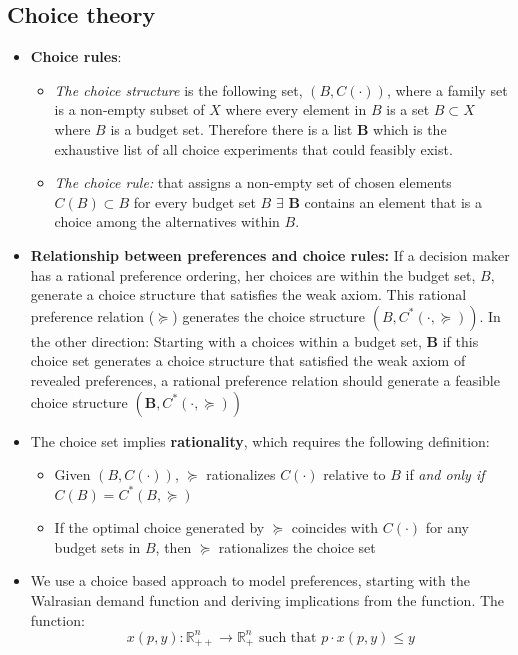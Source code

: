 \documentclass{article}
\begin{document}
\subsection{Choice theory}
\begin{itemize}
    \item \textbf{Choice rules}: 
    \begin{itemize}
        \item \textit{The choice structure} is the following set, $(B, C(\cdot))$, where a family set is a non-empty subset of $X$ where every element in $B$ is a set $B \subset X$ where $B$ is a budget set. Therefore there is a list $\textbf{B}$ which is the exhaustive list of all choice experiments that could feasibly exist.
    \item \textit{The choice rule:} that assigns a non-empty set of chosen elements $C(B) \subset B$ for every budget set $B$  $\exists $\textbf{ B } contains an element that is a choice among the alternatives within $B$. 
    \end{itemize}
    \item \textbf{Relationship between preferences and choice rules:} If a decision maker has a rational preference ordering, her choices are within the budget set, $B$, generate a choice structure that satisfies the weak axiom. This rational preference relation ($\succeq$) generates the choice structure $(B, C^*(\cdot, \succeq))$. In the other direction: Starting with a choices within a budget set, $\textbf{B}$ if this choice set generates a choice structure that satisfied the weak axiom of revealed preferences, a rational preference relation should generate a feasible choice structure $(\textbf{B}, C^*(\cdot, \succeq))$
    \item The choice set implies \textbf{rationality}, which requires the following definition: 
    \begin{itemize}
        \item Given $(B, C(\cdot))$, $\succeq$ rationalizes $C(\cdot)$ relative to $B$ if \textit{and only if} $C(B) = C^*(B, \succeq)$ 
        \item If the optimal choice generated by $\succeq$ coincides with $C(\cdot)$ for any budget sets in $B$, then $\succeq$ rationalizes the choice set        
    \end{itemize}
    \item We use a choice based approach to model preferences, starting with the Walrasian demand function and deriving implications from the function. The function: 
    \[
    x(p, y) : \mathbb{R}^n_{++} \to \mathbb{R}^n_{+} \text{ such that } p \cdot x(p, y) \leq y
\]
\end{itemize}
\end{document}
